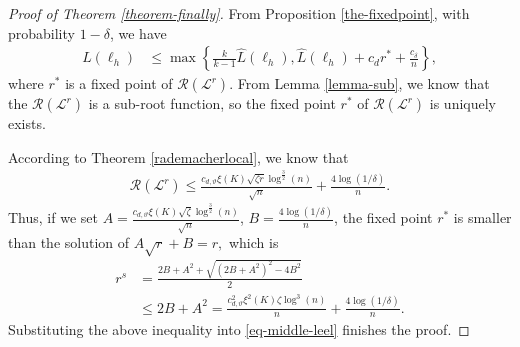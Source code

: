 \documentclass{article}
\begin{document}
\begin{proof}[Proof of Theorem \ref{theorem-finally}]
From Proposition \ref{the-fixedpoint},
with probability $1-\delta$,
we have
\begin{align}
\label{eq-middle-leel}
   L(\ell_h)&\leq \max\left\{
        \frac{k}{k-1}\hat{L}(\ell_h),
       \hat{L}(\ell_h)+c_dr^\ast+\frac{c_\delta}{n}
     \right\},
\end{align}
where $r^\ast$ is a fixed point of $\mathcal{R}(\mathcal{L}^r)$.
From Lemma \ref{lemma-sub},
we know that the $\mathcal{R}(\mathcal{L}^r)$ is a sub-root function,
so the fixed point $r^\ast$ of $\mathcal{R}(\mathcal{L}^r)$ is uniquely exists.

According to  Theorem \ref{rademacherlocal}, we know that
\begin{align*}
    \mathcal{R}(\mathcal{L}^r) \leq \frac{c_{d,\vartheta}\xi(K)\sqrt{\zeta r}\log^{\frac{3}{2}}(n)}{\sqrt{n}}+\frac{4\log(1/\delta)}{n}.
  \end{align*}
Thus, if we set $A=\frac{c_{d,\vartheta}\xi(K)\sqrt{\zeta}\log^{\frac{3}{2}}(n)}{\sqrt{n}}$, $B=\frac{4\log(1/\delta)}{n}$,
the fixed point $r^\ast$ is smaller than the solution of
  $
     A\sqrt{r}+B=r,
  $
   which is
   \begin{align*}
     r^s&=\frac{2B+A^2+\sqrt{(2B+A^2)^2-4B^2}}{2}\\
     &\leq 2B+A^2
     =\frac{c_{d,\vartheta}^2\xi^2(K)\zeta\log^3(n)}{n}+\frac{4\log(1/\delta)}{n}.
   \end{align*}
   Substituting the above inequality into \eqref{eq-middle-leel} finishes the proof.
\end{proof}
\end{document}
